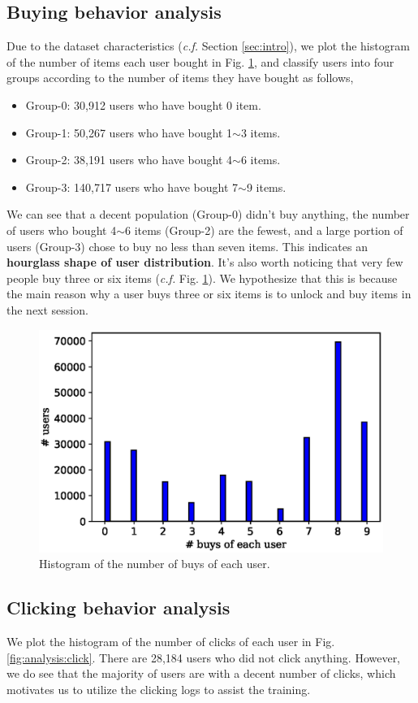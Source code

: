 \subsection{Buying behavior analysis} \label{sec:eda:buyanalysis}
Due to the dataset characteristics (\textit{c.f.} Section \ref{sec:intro}), we plot the histogram of the number of items each user bought in Fig. \ref{fig:analysis:buy}, and classify users into four groups according to the number of items they have bought as follows,
\begin{itemize}
    \item Group-0: 30,912 users who have bought 0 item.
    \item Group-1: 50,267 users who have bought 1$\sim$3 items.
    \item Group-2: 38,191 users who have bought 4$\sim$6 items.
    \item Group-3: 140,717 users who have bought 7$\sim$9 items.
\end{itemize}
We can see that a decent population (Group-0) didn't buy anything, the number of users who bought 4$\sim$6 items (Group-2) are the fewest, and a large portion of users (Group-3) chose to buy no less than seven items. This indicates an \textbf{hourglass shape of user distribution}.
It's also worth noticing that very few people buy three or six items (\textit{c.f.} Fig. \ref{fig:analysis:buy}). We hypothesize that this is because the main reason why a user buys three or six items is to unlock and buy items in the next session.

\begin{figure}[t!]
    \centering
    \includegraphics[width=0.8\linewidth]{figures/analysis/buy.eps}
    \caption{Histogram of the number of buys of each user.}
    \label{fig:analysis:buy}
\end{figure}


\subsection{Clicking behavior analysis} 
We plot the histogram of the number of clicks of each user in Fig. \ref{fig:analysis:click}.
There are 28,184 users who did not click anything. However, we do see that the majority of users are with a decent number of clicks, which motivates us to utilize the clicking logs to assist the training.

